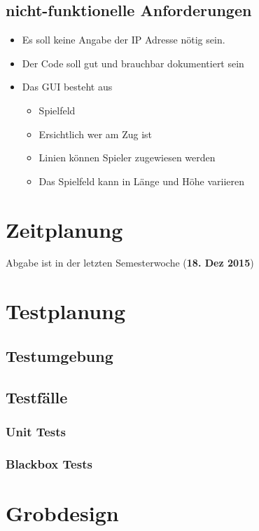 \documentclass[a4paper, 10pt, fleqn]{article}
\begin{document}
		\subsection{nicht-funktionelle Anforderungen}
			\begin{itemize}
				\item Es soll keine Angabe der IP Adresse nötig sein.
				\item Der Code soll gut und brauchbar dokumentiert sein
				\item Das GUI besteht aus
				\begin{itemize}
					\item Spielfeld
					\item Ersichtlich wer am Zug ist
					\item Linien können Spieler zugewiesen werden
					\item Das Spielfeld kann in Länge und Höhe variieren
				\end{itemize}
			\end{itemize}
	
	\clearpage
	\section{Zeitplanung}
		Abgabe ist in der letzten Semesterwoche (\textbf{18. Dez 2015})
	
	\clearpage
	\section{Testplanung}
		\subsection{Testumgebung}
		
		\subsection{Testfälle}
			 \subsubsection{Unit Tests}
			 
			  \subsubsection{Blackbox Tests}
			  
	\clearpage
	\section{Grobdesign}
\end{document}
